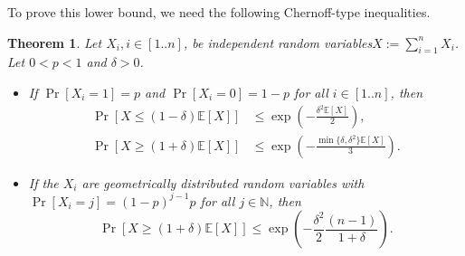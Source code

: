 \documentclass{sig-alternate}
\newtheorem{thm}{Theorem}  %
\newcommand{\N}{{\mathbb{N}}}
\newcommand{\E}{{\mathbb{E}}}   %
\begin{document}
To prove this lower bound, we need the following Chernoff-type inequalities.
\begin{thm}\label{t:problow}
  Let $X_i, i\in[1..n]$, be independent random variables\quad $X:=\sum_{i=1}^n X_i$. Let $0<p<1$ and $\delta>0$.
  \begin{itemize}
  \item[a)] If $\Pr[X_i=1]=p$ and $\Pr[X_i=0]=1-p$ for all $i \in [1..n]$, then
    \begin{align*}
    \Pr[X \le (1-\delta) \E[X]] &\le \exp\left(-\frac{\delta^2 \E[X]}{2}\right),\\
    \Pr[X \ge (1+\delta) \E[X]] &\le \exp\left(-\frac{\min\{\delta,\delta^2\} \E[X]}{3}\right).
    \end{align*}
   \item[b)] If the $X_i$ are geometrically distributed random variables with $\Pr[X_i= j] = (1-p)^{j-1}p$ for all $j\in\N$, then
     \[
     \Pr[X \ge (1+\delta)\E[X]]  \le \exp\left(-\frac{\delta^2}{2}\frac{(n-1)}{1+\delta}\right).
     \]
  \end{itemize}
\end{thm}
\end{document}
